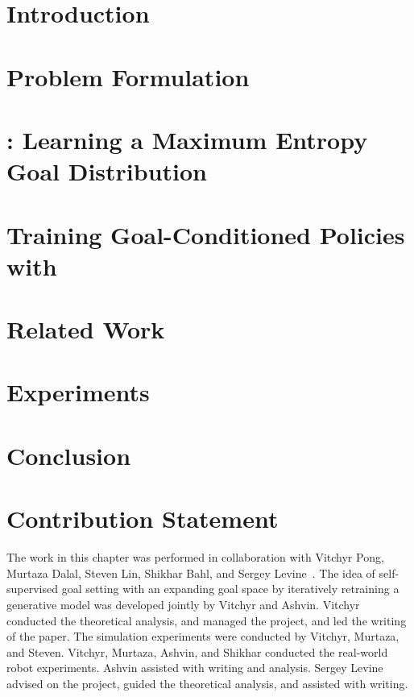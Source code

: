 \section{Introduction}\label{sec:introduction}


\setlength{\textfloatsep}{0.5\baselineskip plus 0.2\baselineskip minus 0.2\baselineskip}
\setlength{\dbltextfloatsep}{0.5\baselineskip plus 0.2\baselineskip minus 0.2\baselineskip}

\section{Problem Formulation}\label{sec:background}


\section{\METHOD: Learning a Maximum Entropy Goal Distribution}
\label{sec:method}


\section{Training Goal-Conditioned Policies with \METHOD}
\label{sec:train-policy}


\section{Related Work}\label{sec:related_work}


\section{Experiments}\label{sec:experiments}


\section{Conclusion}\label{sec:conclusion}


\section{Contribution Statement}

The work in this chapter was performed in collaboration with Vitchyr Pong, Murtaza Dalal, Steven Lin, Shikhar Bahl, and Sergey Levine~\citep{pong2019skewfit}. The idea of self-supervised goal setting with an expanding goal space by iteratively retraining a generative model was developed jointly by Vitchyr and Ashvin. Vitchyr conducted the theoretical analysis, and managed the project, and led the writing of the paper. The simulation experiments were conducted by Vitchyr, Murtaza, and Steven. Vitchyr, Murtaza, Ashvin, and Shikhar conducted the real-world robot experiments. Ashvin assisted with writing and analysis. Sergey Levine advised on the project, guided the theoretical analysis, and assisted with writing.

